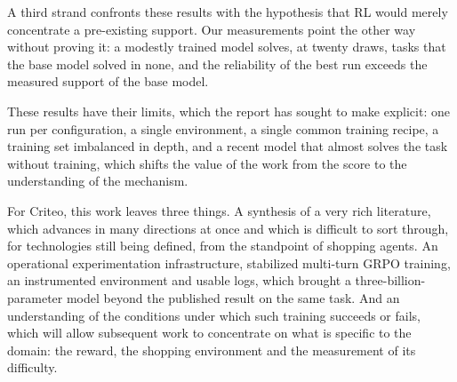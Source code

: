\documentclass[11pt,a4paper]{article}
\begin{document}
A third strand confronts these results with the hypothesis that RL would merely concentrate a pre-existing support. Our measurements point the other way without proving it: a modestly trained model solves, at twenty draws, tasks that the base model solved in none, and the reliability of the best run exceeds the measured support of the base model.

These results have their limits, which the report has sought to make explicit: one run per configuration, a single environment, a single common training recipe, a training set imbalanced in depth, and a recent model that almost solves the task without training, which shifts the value of the work from the score to the understanding of the mechanism.






For Criteo, this work leaves three things. A synthesis of a very rich literature, which advances in many directions at once and which is difficult to sort through, for technologies still being defined, from the standpoint of shopping agents. An operational experimentation infrastructure, stabilized multi-turn GRPO training, an instrumented environment and usable logs, which brought a three-billion-parameter model beyond the published result on the same task. And an understanding of the conditions under which such training succeeds or fails, which will allow subsequent work to concentrate on what is specific to the domain: the reward, the shopping environment and the measurement of its difficulty.










\newpage



\newpage
\end{document}
